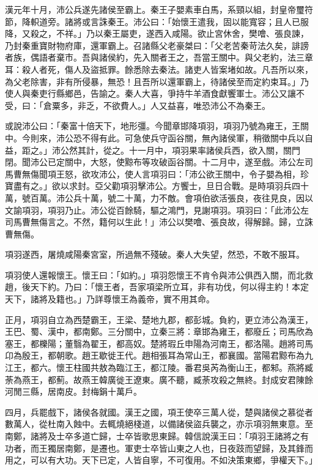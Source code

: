 \begin{pinyinscope}
漢元年十月，沛公兵遂先諸侯至霸上。秦王子嬰素車白馬，系頸以組，封皇帝璽符節，降軹道旁。諸將或言誅秦王。沛公曰：「始懷王遣我，固以能寬容；且人已服降，又殺之，不祥。」乃以秦王屬吏，遂西入咸陽。欲止宮休舍，樊噲、張良諫，乃封秦重寶財物府庫，還軍霸上。召諸縣父老豪桀曰：「父老苦秦苛法久矣，誹謗者族，偶語者棄市。吾與諸侯約，先入關者王之，吾當王關中。與父老約，法三章耳：殺人者死，傷人及盜抵罪。餘悉除去秦法。諸吏人皆案堵如故。凡吾所以來，為父老除害，非有所侵暴，無恐！且吾所以還軍霸上，待諸侯至而定約束耳。」乃使人與秦吏行縣鄉邑，告諭之。秦人大喜，爭持牛羊酒食獻饗軍士。沛公又讓不受，曰：「倉粟多，非乏，不欲費人。」人又益喜，唯恐沛公不為秦王。

或說沛公曰：「秦富十倍天下，地形彊。今聞章邯降項羽，項羽乃號為雍王，王關中。今則來，沛公恐不得有此。可急使兵守函谷關，無內諸侯軍，稍徵關中兵以自益，距之。」沛公然其計，從之。十一月中，項羽果率諸侯兵西，欲入關，關門閉。聞沛公已定關中，大怒，使黥布等攻破函谷關。十二月中，遂至戲。沛公左司馬曹無傷聞項王怒，欲攻沛公，使人言項羽曰：「沛公欲王關中，令子嬰為相，珍寶盡有之。」欲以求封。亞父勸項羽擊沛公。方饗士，旦日合戰。是時項羽兵四十萬，號百萬。沛公兵十萬，號二十萬，力不敵。會項伯欲活張良，夜往見良，因以文諭項羽，項羽乃止。沛公從百餘騎，驅之鴻門，見謝項羽。項羽曰：「此沛公左司馬曹無傷言之。不然，籍何以生此！」沛公以樊噲、張良故，得解歸。歸，立誅曹無傷。

項羽遂西，屠燒咸陽秦宮室，所過無不殘破。秦人大失望，然恐，不敢不服耳。

項羽使人還報懷王。懷王曰：「如約。」項羽怨懷王不肯令與沛公俱西入關，而北救趙，後天下約。乃曰：「懷王者，吾家項梁所立耳，非有功伐，何以得主約！本定天下，諸將及籍也。」乃詳尊懷王為義帝，實不用其命。

正月，項羽自立為西楚霸王，王梁、楚地九郡，都彭城。負約，更立沛公為漢王，王巴、蜀、漢中，都南鄭。三分關中，立秦三將：章邯為雍王，都廢丘；司馬欣為塞王，都櫟陽；董翳為翟王，都高奴。楚將瑕丘申陽為河南王，都洛陽。趙將司馬卬為殷王，都朝歌。趙王歇徙王代。趙相張耳為常山王，都襄國。當陽君黥布為九江王，都六。懷王柱國共敖為臨江王，都江陵。番君吳芮為衡山王，都邾。燕將臧荼為燕王，都薊。故燕王韓廣徙王遼東。廣不聽，臧荼攻殺之無終。封成安君陳餘河閒三縣，居南皮。封梅鋗十萬戶。

四月，兵罷戲下，諸侯各就國。漢王之國，項王使卒三萬人從，楚與諸侯之慕從者數萬人，從杜南入蝕中。去輒燒絕棧道，以備諸侯盜兵襲之，亦示項羽無東意。至南鄭，諸將及士卒多道亡歸，士卒皆歌思東歸。韓信說漢王曰：「項羽王諸將之有功者，而王獨居南鄭，是遷也。軍吏士卒皆山東之人也，日夜跂而望歸，及其鋒而用之，可以有大功。天下已定，人皆自寧，不可復用。不如決策東鄉，爭權天下。」


\end{pinyinscope}
